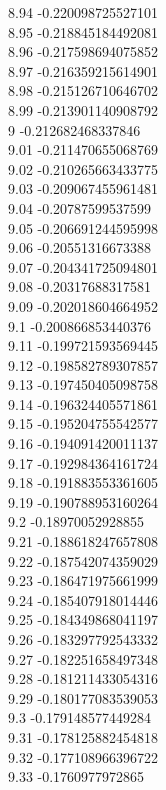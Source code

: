 {8.94	-0.220098725527101\\
8.95	-0.218845184492081\\
8.96	-0.217598694075852\\
8.97	-0.216359215614901\\
8.98	-0.215126710646702\\
8.99	-0.213901140908792\\
9	-0.212682468337846\\
9.01	-0.211470655068769\\
9.02	-0.210265663433775\\
9.03	-0.209067455961481\\
9.04	-0.20787599537599\\
9.05	-0.206691244595998\\
9.06	-0.20551316673388\\
9.07	-0.204341725094801\\
9.08	-0.20317688317581\\
9.09	-0.202018604664952\\
9.1	-0.200866853440376\\
9.11	-0.199721593569445\\
9.12	-0.198582789307857\\
9.13	-0.197450405098758\\
9.14	-0.196324405571861\\
9.15	-0.195204755542577\\
9.16	-0.194091420011137\\
9.17	-0.192984364161724\\
9.18	-0.191883553361605\\
9.19	-0.190788953160264\\
9.2	-0.18970052928855\\
9.21	-0.188618247657808\\
9.22	-0.187542074359029\\
9.23	-0.186471975661999\\
9.24	-0.185407918014446\\
9.25	-0.184349868041197\\
9.26	-0.183297792543332\\
9.27	-0.182251658497348\\
9.28	-0.181211433054316\\
9.29	-0.180177083539053\\
9.3	-0.179148577449284\\
9.31	-0.178125882454818\\
9.32	-0.177108966396722\\
9.33	-0.1760977972865\\
}
